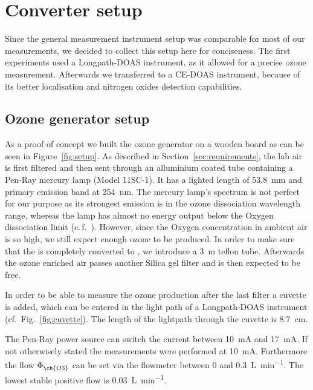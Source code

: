 \section{Converter setup}
\label{sec:setup}

Since the general measurement instrument setup was comparable for most
of our measurements, we decided to collect this setup here for
conciseness. The first experiments used a Longpath-DOAS instrument, as
it allowed for a precise ozone measurement. Afterwards we transferred
to a CE-DOAS instrument, because of its better localisation and
nitrogen oxides detection capabilities.

\subsection{Ozone generator setup}
\label{sec:ozone-setup}

As a proof of concept we built the ozone generator on a wooden board
as can be seen in Figure~\ref{fig:setup}. As described in
Section~\ref{sec:requirements}, the lab air is first filtered and then
sent through an alluminium coated tube containing a Pen-Ray mercury
lamp (Model 11SC-1). It has a lighted length of
\SI{53.8}{\milli\meter} and primary emission band at
\SI{254}{\nano\meter}. The mercury lamp's spectrum is not perfect for
our purpose as its strongest emission is in the ozone dissociation
wavelength range, whereas the lamp has almost no energy output below
the Oxygen dissociation limit (c.\,f.~\cite{lamp}). However, since the
Oxygen concentration in ambient air is so high, we still expect enough
ozone to be produced. In order to make sure that the  is completely
converted to , we introduce a \SI{3}{\meter} teflon
tube. Afterwards the ozone enriched air passes another Silica gel
filter and is then expected to be  free.

In order to be able to measure the ozone production after the last filter a
cuvette is added, which can be entered in the light path of a
Longpath-DOAS instrument (cf.\ Fig.~\ref{fig:cuvette}). The length of
the lightpath through the cuvette is \SI{8.7}{\centi\meter}. 

The Pen-Ray power source can switch the current between
\SI{10}{\milli\ampere} and \SI{17}{\milli\ampere}. If not otherwisely
stated the measurements were performed at \SI{10}{\milli\ampere}.
Furthermore the flow $\Phi_{\ch{O 3}}$ can be set via the flowmeter
between \num{0} and \SI{0.3}{\liter\per\minute}. The lowest stable
positive flow is \SI{0.03}{\liter\per\minute}.

